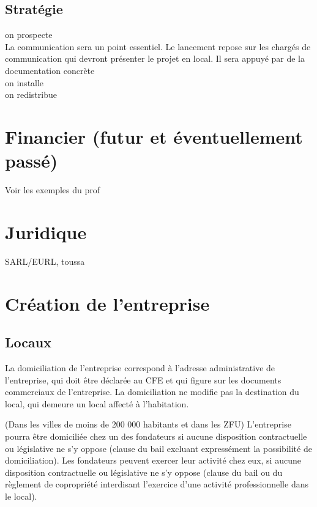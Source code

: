 \documentclass[10pt]{article}
\begin{document}
\subsection{Stratégie}
\label{sub:strategie}
on prospecte\\
La communication sera un point essentiel. Le lancement repose sur les chargés de communication qui devront présenter le projet en local. Il sera appuyé par de la documentation concrète \\
on installe\\
on redistribue\\


\section{Financier (futur et éventuellement passé)}
\label{sec:financier}
Voir les exemples du prof

\section{Juridique}
\label{sec:juridique}
SARL/EURL, toussa

\section{Création de l'entreprise}
\label{sec:creation_entreprise}

\subsection{Locaux}
\label{sub:locaux}

La domiciliation de l'entreprise correspond à l'adresse administrative de l'entreprise, qui doit être déclarée au CFE et qui figure sur les documents commerciaux de l'entreprise. La domiciliation ne modifie pas la destination du local, qui demeure un local affecté à l'habitation.

(Dans les villes de moins de 200 000 habitants et dans les ZFU) L'entreprise pourra être domiciliée chez un des fondateurs si aucune disposition contractuelle ou législative ne s'y oppose (clause du bail excluant expressément la possibilité de domiciliation). Les fondateurs peuvent exercer leur activité chez eux, si aucune disposition contractuelle ou législative ne s'y oppose (clause du bail ou du règlement de copropriété interdisant l'exercice d'une activité professionnelle dans le local).
\end{document}
